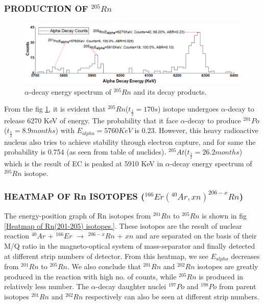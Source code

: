 \documentclass[12pt]{article}
\begin{document}
\subsubsection{PRODUCTION OF $^{205}Rn$}
\begin{figure}[h]
\centering
\includegraphics[scale=0.5]{Rn205.png}
\caption{$\alpha$-decay energy spectrum of $^{205}Rn$ and its decay products.}
\label{alpha-decay energy spectrum of 205Rn and its decay products.}
\end{figure}

From the fig \ref{alpha-decay energy spectrum of 205Rn and its decay products.}, it is evident that $^{205}Rn$($t_\frac{1}{2}=170s$) isotope undergoes $\alpha$-decay to release 6270 KeV of energy. The probability that it face $\alpha$-decay to produce $^{201}Po$($t_\frac{1}{2}=8.9 months$) with $E_{alpha}=5760 KeV$ is 0.23. However, this heavy radioactive nucleus also tries to achieve stability through electron capture, and for same the probability is 0.754 (as seen from table of nuclides). $^{205}At$($t_\frac{1}{2}=26.2 months$) which is the result of EC is peaked at 5910 KeV in $\alpha$-decay energy spectrum of $^{205}Rn$ isotope.

\subsubsection{HEATMAP OF Rn ISOTOPES ($^{166}Er(^{40}Ar,xn)^{206-x}Rn$)}

The energy-position graph of Rn isotopes from $^{201}Rn$ to $^{205}Rn$ is shown in fig \ref{Heatmap of Rn(201-205) isotopes.}. These isotopes are the result of nuclear reaction $^{40}Ar$ + $^{166}Er$ $\rightarrow$ $^{206-x}Rn$ + $xn$ and are separated on the basis of their M/Q ratio in the magneto-optical system of mass-separator and finally detected at different strip numbers of detector. From this heatmap, we see $E_{alpha}$ decreases from $^{201}Rn$ to $^{205}Rn$. We also conclude that $^{201}Rn$ and $^{202}Rn$ isotopes are greatly produced in the reaction with high no. of counts, while $^{205}Rn$ is produced in relatively less number. The $\alpha$-decay daughter nuclei $^{197}Po$ and $^{198}Po$ from parent isotopes $^{201}Rn$ and $^{202}Rn$ respectively can also be seen at different strip numbers.
\end{document}
